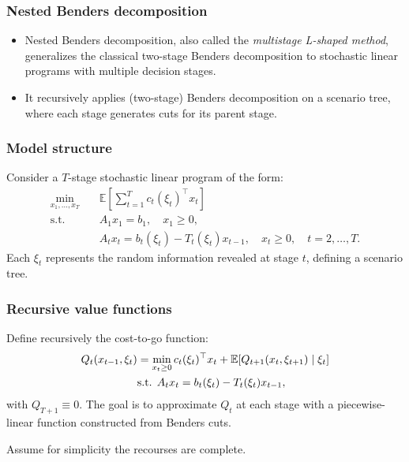 \documentclass{beamer}
\begin{document}
\begin{frame}
\frametitle{Nested Benders decomposition}

\begin{itemize}
	\item 
Nested Benders decomposition, also called the \emph{multistage L-shaped method}, generalizes the classical two-stage Benders decomposition to stochastic linear programs with multiple decision stages.
\item 
It recursively applies (two-stage) Benders decomposition on a scenario tree, where each stage generates cuts for its parent stage.
\end{itemize}

\end{frame}

\begin{frame}
\frametitle{Model structure}

Consider a $T$-stage stochastic linear program of the form:
\begin{align*}
	\min_{x_1, \ldots, x_T} \quad & \mathbb{E} \left[ \sum_{t=1}^T c_t(\xi_t)^\top x_t \right] \\
	\text{s.t.} \quad & A_1 x_1 = b_1, \quad x_1 \ge 0, \\
	& A_t x_t = b_t(\xi_t) - T_t(\xi_t) x_{t-1}, \quad x_t \ge 0, \quad t = 2, \ldots, T.
\end{align*}
Each $\xi_t$ represents the random information revealed at stage $t$, defining a scenario tree.

\end{frame}

\begin{frame}
\frametitle{Recursive value functions}

Define recursively the cost-to-go function:
\begin{align*}
	Q_t(x_{t-1}, \xi_t) & = 
	\min_{x_t \ge 0} c_t(\xi_t)^\top x_t + {\mathbb{E}}[ Q_{t+1}(x_t, \xi_{t+1}) \mid \xi_t ] \\
	& \mbox{s.t. } A_t x_t = b_t(\xi_t) - T_t(\xi_t) x_{t-1},
\end{align*}
with $Q_{T+1} \equiv 0$. The goal is to approximate $Q_t$ at each stage with a piecewise-linear function constructed from Benders cuts.

\mbox{}

Assume for simplicity the recourses are complete.

\end{frame}
\end{document}
